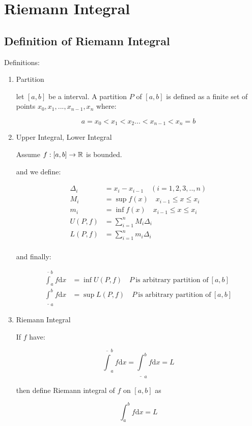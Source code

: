 \section{Riemann Integral}

\subsection{Definition of Riemann Integral}

\begin{definition}
    Definitions:

    \begin{enumerate}
        \item Partition

    let $[a,b]$ be a interval. A partition $P$ of $[a,b]$ is defined as a finite set of points
    $x_0,x_1,...,x_{n-1},x_n$ where:
    
    \[
        a=x_0 < x_1 < x_2 ... < x_{n-1} < x_n = b
    \]

        \item Upper Integral, Lower Integral


    Assume $f: [a,b] \to \mathbb{R}$ is bounded.

    and we define:

    \begin{align*}
        \Delta_i &= x_i - x_{i-1} \quad (i=1,2,3,..,n) \\
        M_i &= \sup f(x) \quad x_{i-1} \le x \le x_i \\
        m_i &= \inf f(x) \quad x_{i-1} \le x \le x_i\\
        U(P, f) &= \sum_{i=1}^{n} M_i \Delta_i \\
        L(P, f) &= \sum_{i=1}^{n} m_i \Delta_i \\
    \end{align*}

    and finally:

    \begin{align*}
        \overline{\int}_a^b f \mathrm{d} x &= \inf U(P, f) \quad  P \: \text{is arbitrary partition of}\: [a,b] \\
        \underline{\int}_a^b f \mathrm{d} x &= \sup L(P, f) \quad P \: \text{is arbitrary partition of}\: [a,b]
    \end{align*}

    \item Riemann Integral

    If $f$ have:

    \[
        \overline{\int}_a^b f \mathrm{d} x  = \underline{\int}_a^b f \mathrm{d} x  = L
    \]

    then define Riemann integral of $f$ on $[a,b]$ as

    \[
        \int_a^b f \mathrm{d} x  = L
    \]
    \end{enumerate}
\end{definition}

